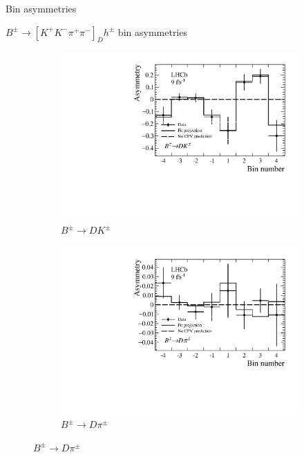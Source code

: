 \documentclass{beamer}
\begin{document}
\begin{frame}{Bin asymmetries}
  \begin{center}
    $B^\pm\to[K^+K^-\pi^+\pi^-]_Dh^\pm$ bin asymmetries
  \end{center}
  \begin{figure}
    \centering
    \begin{subfigure}{0.5\textwidth}
      \centering
      \includegraphics[width=1.0\textwidth]{Plots/BinAsymmetries_dk_KKpipi.pdf}
      \caption*{$B^\pm\to DK^\pm$}
    \end{subfigure}%
    \begin{subfigure}{0.5\textwidth}
      \centering
      \includegraphics[width=1.0\textwidth]{Plots/BinAsymmetries_dpi_KKpipi.pdf}
      \caption*{$B^\pm\to D\pi^\pm$}
    \end{subfigure}
  \end{figure}
\end{frame}
\end{document}
